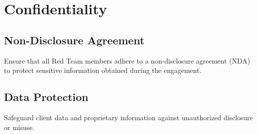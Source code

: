 \section*{Confidentiality}

\subsection*{    Non-Disclosure Agreement}
        Ensure that all Red Team members adhere to a non-disclosure agreement (NDA) to protect sensitive information obtained during the engagement.
 \subsection*{   Data Protection}
        Safeguard client data and proprietary information against unauthorized disclosure or misuse.
